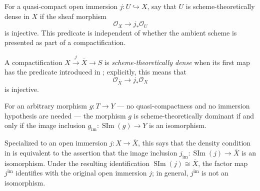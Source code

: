 \begin{definition}
  \label{def:nagata-scheme-theoretically-dense-open}

  For a quasi-compact open immersion $j\colon U\hookrightarrow X$, say that
  $U$ is scheme-theoretically dense in $X$ if the sheaf morphism
  \[
    \mathcal O_X\longrightarrow j_*\mathcal O_U
  \]
  is injective.  This predicate is independent of whether the ambient scheme
  is presented as part of a compactification.
\end{definition}

\begin{definition}
  \label{def:nagata-dense-compactification}
  \leanok

  A compactification $X\xrightarrow{j}\overline X\to S$ is
  \emph{scheme-theoretically dense} when its first map has the predicate
  introduced in ; explicitly,
  this means that
  \[
    \mathcal O_{\overline X}\longrightarrow j_*\mathcal O_X
  \]
  is injective.
\end{definition}

\begin{lemma}
  \label{lemma:nagata-dense-compactification-characterization}
  \leanok

  For an arbitrary morphism $g\colon T\to Y$ --- no quasi-compactness and no
  immersion hypothesis are needed --- the morphism $g$ is scheme-theoretically
  dominant if and only if the image inclusion
  $g_{\mathrm{im}}\colon\operatorname{SIm}(g)\to Y$ is an isomorphism.

  Specialized to an open immersion $j\colon X\to\overline X$, this says that
  the density condition in
   is equivalent to the assertion that
  the image inclusion
  $j_{\mathrm{im}}\colon\operatorname{SIm}(j)\to\overline X$ is an
  isomorphism.  Under the resulting identification
  $\operatorname{SIm}(j)\cong\overline X$, the factor map
  $j^{\mathrm{im}}$ identifies with the original open immersion $j$; in
  general, $j^{\mathrm{im}}$ is not an isomorphism.
\end{lemma}

